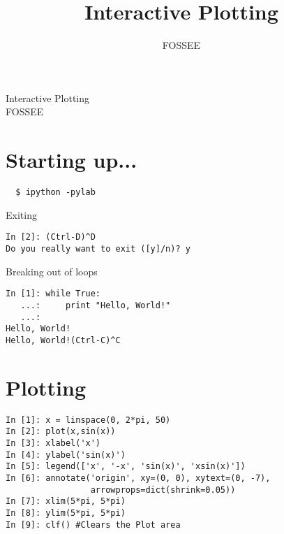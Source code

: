 \documentclass[12pt]{article}
\title{Interactive Plotting}
\author{FOSSEE}
\begin{document}
\date{}
\vspace{-1in}
\begin{center}
\LARGE{Interactive Plotting}\\
\large{FOSSEE}
\end{center}
\section{Starting up...}

\begin{verbatim}
  $ ipython -pylab  
\end{verbatim}
Exiting 
\begin{verbatim}     
In [2]: (Ctrl-D)^D
Do you really want to exit ([y]/n)? y
\end{verbatim}
Breaking out of loops
\begin{verbatim}     
In [1]: while True:
   ...:     print "Hello, World!"
   ...:     
Hello, World!
Hello, World!(Ctrl-C)^C
\end{verbatim}

\section{Plotting}
\begin{verbatim}
In [1]: x = linspace(0, 2*pi, 50)
In [2]: plot(x,sin(x))
In [3]: xlabel('x')
In [4]: ylabel('sin(x)')
In [5]: legend(['x', '-x', 'sin(x)', 'xsin(x)'])
In [6]: annotate('origin', xy=(0, 0), xytext=(0, -7),
                 arrowprops=dict(shrink=0.05))
In [7]: xlim(5*pi, 5*pi)
In [8]: ylim(5*pi, 5*pi)
In [9]: clf() #Clears the Plot area
\end{verbatim}
\end{document}
